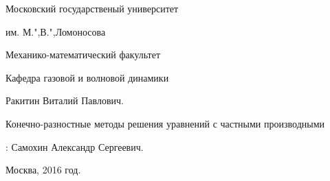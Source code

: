 \begin{titlepage}
\thispagestyle{empty}
\setcounter{page}{0}
\begin{center}{
\Large Московский государственый университет 

им. М.",В.",Ломоносова

Механико-математический факультет

Кафедра газовой и волновой динамики}
\end{center}
\vspace{120pt}
\begin{center}
\Large Ракитин Виталий Павлович.
\end{center}
\vspace{20pt}
\begin{center}{\LARGE Конечно-разностные методы решения уравнений с частными производными}
\end{center}
\vspace{80pt}


\begin{flushleft}
{:
\vspace{6pt}
Самохин Александр Сергеевич.}
\end{flushleft}


\vfill
\begin{center}
Москва, 2016 год.
\end{center}

\end{titlepage}